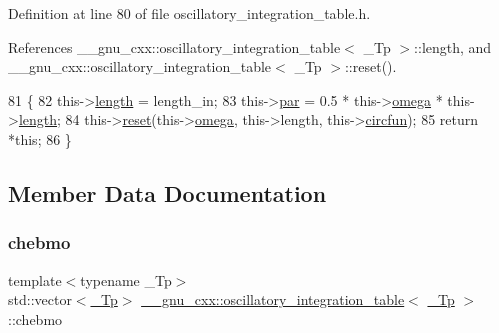 Definition at line 80 of file oscillatory\+\_\+integration\+\_\+table.\+h.



References \+\_\+\+\_\+gnu\+\_\+cxx\+::oscillatory\+\_\+integration\+\_\+table$<$ \+\_\+\+Tp $>$\+::length, and \+\_\+\+\_\+gnu\+\_\+cxx\+::oscillatory\+\_\+integration\+\_\+table$<$ \+\_\+\+Tp $>$\+::reset().


\begin{DoxyCode}
81       \{
82         this->\hyperlink{struct____gnu__cxx_1_1oscillatory__integration__table_ad8654aa233b4878af8d9a99ed61db488}{length} = length\_in;
83         this->\hyperlink{struct____gnu__cxx_1_1oscillatory__integration__table_ae98255b8cccea27dde0047c45cfc2ac6}{par} = 0.5 * this->\hyperlink{struct____gnu__cxx_1_1oscillatory__integration__table_a722a28c43e85cce33bbe6337e6a5c9eb}{omega} * this->\hyperlink{struct____gnu__cxx_1_1oscillatory__integration__table_ad8654aa233b4878af8d9a99ed61db488}{length};
84         this->\hyperlink{struct____gnu__cxx_1_1oscillatory__integration__table_a6eac687c4e5dc65c8bf6626b24839975}{reset}(this->\hyperlink{struct____gnu__cxx_1_1oscillatory__integration__table_a722a28c43e85cce33bbe6337e6a5c9eb}{omega}, this->length, this->\hyperlink{struct____gnu__cxx_1_1oscillatory__integration__table_a21f86f96ca3654c18fa987f15bc14eaf}{circfun});
85         \textcolor{keywordflow}{return} *\textcolor{keyword}{this};
86       \}
\end{DoxyCode}


\subsection{Member Data Documentation}
\mbox{\label{struct____gnu__cxx_1_1oscillatory__integration__table_a29c973330c5f164962da57a528ccab55}} 
\subsubsection{\texorpdfstring{chebmo}{chebmo}}
{\footnotesize\ttfamily template$<$typename \+\_\+\+Tp$>$ \\
std\+::vector$<$\hyperlink{namespace____gnu__cxx_a3b19a9c800ca194374ef9172290f7d79}{\+\_\+\+Tp}$>$ \hyperlink{struct____gnu__cxx_1_1oscillatory__integration__table}{\+\_\+\+\_\+gnu\+\_\+cxx\+::oscillatory\+\_\+integration\+\_\+table}$<$ \hyperlink{namespace____gnu__cxx_a3b19a9c800ca194374ef9172290f7d79}{\+\_\+\+Tp} $>$\+::chebmo}



